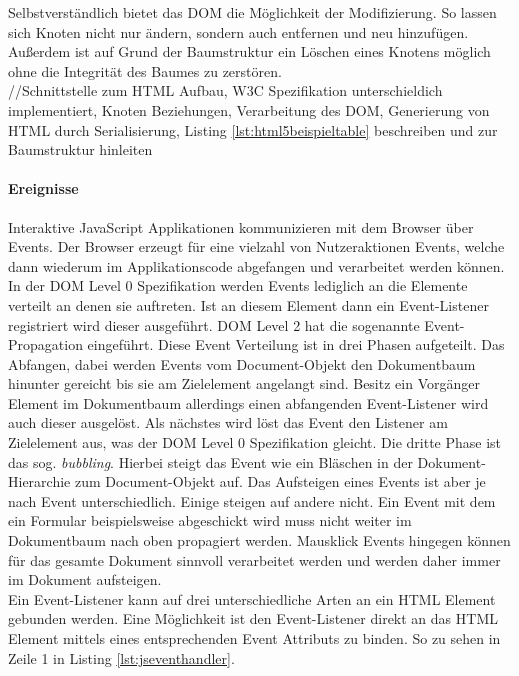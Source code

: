 \documentclass[12pt,a4paper,bibliography=totocnumbered,listof=totocnumbered]{scrartcl}
\begin{document}
Selbstverständlich bietet das DOM die Möglichkeit der Modifizierung. So lassen sich Knoten nicht nur ändern, sondern auch entfernen und neu hinzufügen. Außerdem ist auf Grund der Baumstruktur ein Löschen eines Knotens möglich ohne die Integrität des Baumes zu zerstören.\\

//Schnittstelle zum HTML Aufbau, W3C Spezifikation unterschieldich implementiert, Knoten Beziehungen, Verarbeitung des DOM, Generierung von HTML durch Serialisierung, Listing \ref{lst:html5beispieltable} beschreiben und zur Baumstruktur hinleiten\\

\paragraph{Ereignisse} Interaktive JavaScript Applikationen kommunizieren mit dem Browser über Events. Der Browser erzeugt für eine vielzahl von Nutzeraktionen Events, welche dann wiederum im Applikationscode abgefangen und verarbeitet werden können. In der DOM Level 0 Spezifikation werden Events lediglich an die Elemente verteilt an denen sie auftreten. Ist an diesem Element dann ein Event-Listener registriert wird dieser ausgeführt. DOM Level 2 hat die sogenannte Event-Propagation eingeführt. Diese Event Verteilung ist in drei Phasen aufgeteilt. Das Abfangen, dabei werden Events vom Document-Objekt den Dokumentbaum hinunter gereicht bis sie am Zielelement angelangt sind. Besitz ein Vorgänger Element im Dokumentbaum allerdings einen abfangenden Event-Listener wird auch dieser ausgelöst. Als nächstes wird löst das Event den Listener am Zielelement aus, was der DOM Level 0 Spezifikation gleicht. Die dritte Phase ist das sog. \textit{bubbling}. Hierbei steigt das Event wie ein Bläschen in der Dokument-Hierarchie zum Document-Objekt auf. Das Aufsteigen eines Events ist aber je nach Event unterschiedlich. Einige steigen auf andere nicht. Ein Event mit dem ein Formular beispielsweise abgeschickt wird muss nicht weiter im Dokumentbaum nach oben propagiert werden. Mausklick Events hingegen können für das gesamte Dokument sinnvoll verarbeitet werden und werden daher immer im Dokument aufsteigen.\\Ein Event-Listener kann auf drei unterschiedliche Arten an ein HTML Element gebunden werden. Eine Möglichkeit ist den Event-Listener direkt an das HTML Element mittels eines entsprechenden Event Attributs zu binden. So zu sehen in Zeile 1 in Listing \ref{lst:jseventhandler}. 
\end{document}
